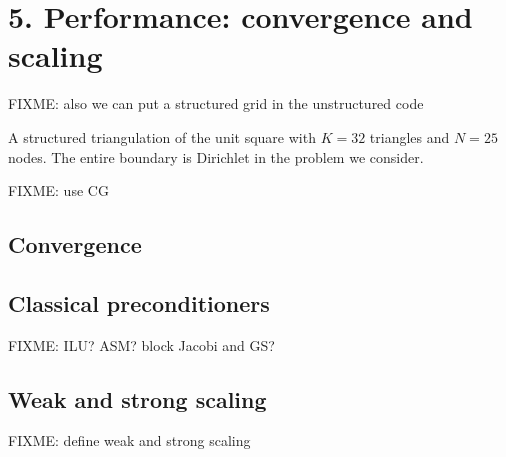 
\chapter{5. Performance: convergence and scaling}

\vspace{4cm}

FIXME: also we can put a structured grid in the unstructured code

\begin{marginfigure}

\caption{A structured triangulation of the unit square with $K=32$ triangles and $N=25$ nodes.  The entire boundary is Dirichlet in the problem we consider.}
\label{fig:structuredfem}
\end{marginfigure}

FIXME: use CG

\section{Convergence}

\section{Classical preconditioners}

FIXME:  ILU?  ASM?  block Jacobi and GS?

\section{Weak and strong scaling}

FIXME: define weak and strong scaling

